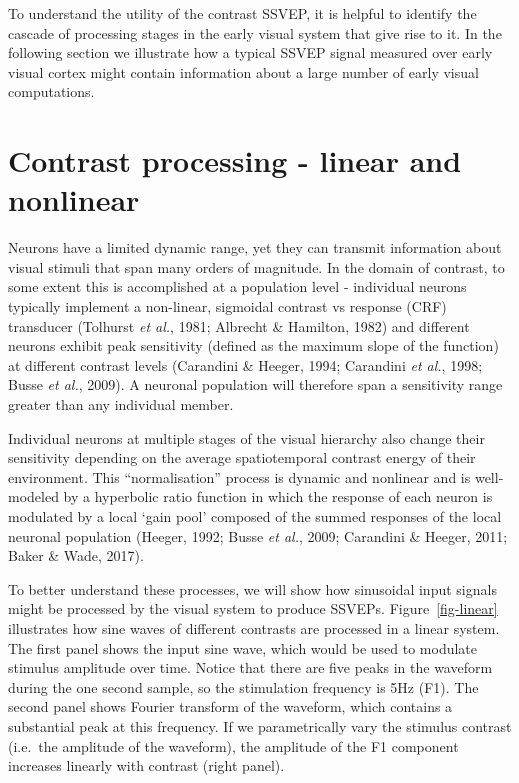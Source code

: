\documentclass[
  letterpaper,
  DIV=11,
  numbers=noendperiod]{scrartcl}
\begin{document}
To understand the utility of the contrast SSVEP, it is helpful to
identify the cascade of processing stages in the early visual system
that give rise to it. In the following section we illustrate how a
typical SSVEP signal measured over early visual cortex might contain
information about a large number of early visual computations.

\section{Contrast processing - linear and
nonlinear}\label{contrast-processing---linear-and-nonlinear}

Neurons have a limited dynamic range, yet they can transmit information
about visual stimuli that span many orders of magnitude. In the domain
of contrast, to some extent this is accomplished at a population level -
individual neurons typically implement a non-linear, sigmoidal contrast
vs response (CRF) transducer (Tolhurst \emph{et al.}, 1981; Albrecht \&
Hamilton, 1982) and different neurons exhibit peak sensitivity (defined
as the maximum slope of the function) at different contrast levels
(Carandini \& Heeger, 1994; Carandini \emph{et al.}, 1998; Busse
\emph{et al.}, 2009). A neuronal population will therefore span a
sensitivity range greater than any individual member.

Individual neurons at multiple stages of the visual hierarchy also
change their sensitivity depending on the average spatiotemporal
contrast energy of their environment. This ``normalisation'' process is
dynamic and nonlinear and is well-modeled by a hyperbolic ratio function
in which the response of each neuron is modulated by a local `gain pool'
composed of the summed responses of the local neuronal population
(Heeger, 1992; Busse \emph{et al.}, 2009; Carandini \& Heeger, 2011;
Baker \& Wade, 2017).

To better understand these processes, we will show how sinusoidal input
signals might be processed by the visual system to produce SSVEPs.
Figure~\ref{fig-linear} illustrates how sine waves of different
contrasts are processed in a linear system. The first panel shows the
input sine wave, which would be used to modulate stimulus amplitude over
time. Notice that there are five peaks in the waveform during the one
second sample, so the stimulation frequency is 5Hz (F1). The second
panel shows Fourier transform of the waveform, which contains a
substantial peak at this frequency. If we parametrically vary the
stimulus contrast (i.e.~the amplitude of the waveform), the amplitude of
the F1 component increases linearly with contrast (right panel).
\end{document}
